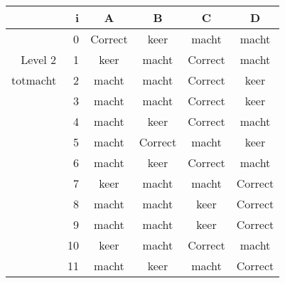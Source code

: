 \begin{tabular}{ rr| c|c|c|c}\hline\hline
     & i & \textbf{A} & \textbf{B} & \textbf{C} & \textbf{D}\\\hline

&0&Correct\cellcolor[gray]{0.6}&keer&macht&macht\\
Level 2 & 1&keer&macht&Correct\cellcolor[gray]{0.6}&macht\\
totmacht &2&macht&macht&Correct\cellcolor[gray]{0.6}&keer\\
&3&macht&macht&Correct\cellcolor[gray]{0.6}&keer\\
&4&macht&keer&Correct\cellcolor[gray]{0.6}&macht\\
&5&macht&Correct\cellcolor[gray]{0.6}&macht&keer\\
&6&macht&keer&Correct\cellcolor[gray]{0.6}&macht\\
&7&keer&macht&macht&Correct\cellcolor[gray]{0.6}\\
&8&macht&macht&keer&Correct\cellcolor[gray]{0.6}\\
&9&macht&macht&keer&Correct\cellcolor[gray]{0.6}\\
&10&keer&macht&Correct\cellcolor[gray]{0.6}&macht\\
&11&macht&keer&macht&Correct\cellcolor[gray]{0.6}\\
\hline\end{tabular}\par\ \newline

